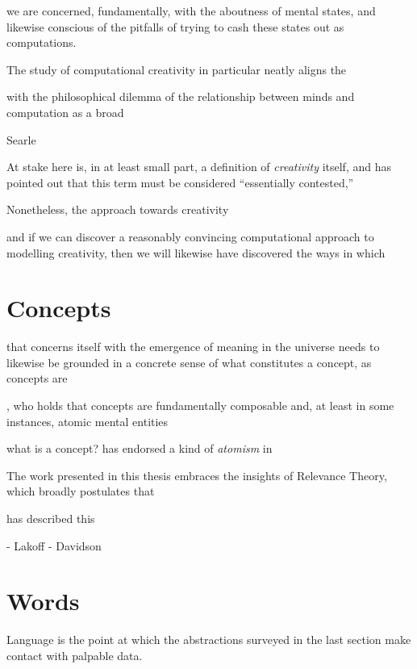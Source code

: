 we are concerned, fundamentally, with the aboutness of mental states, and likewise conscious of the pitfalls of trying to cash these states out as computations.

The study of computational creativity in particular neatly aligns the 

with the philosophical dilemma of the relationship between minds and computation as a broad

Searle

At stake here is, in at least small part, a definition of \emph{creativity} itself, and \cite{Colton} has pointed out that this term must be considered ``essentially contested,''

Nonetheless, the approach towards creativity 

and if we can discover a reasonably convincing computational approach to modelling creativity, then we will likewise have discovered the ways in which 

\section{Concepts}

that concerns itself with the emergence of meaning in the universe needs to likewise be grounded in a concrete sense of what constitutes a concept, as concepts are

\cite{Fodor}, who holds that concepts are fundamentally composable and, at least in some instances, atomic mental entities

what is a concept?  \cite{Fodor} has endorsed a kind of \emph{atomism} in 

\citep[cf][for a case against conceptual schema in general]{Davidson}

The work presented in this thesis embraces the insights of Relevance Theory, which broadly postulates that 

\cite{Carston} has described this 

- Lakoff
- Davidson

\section{Words}
Language is the point at which the abstractions surveyed in the last section make contact with palpable data.

